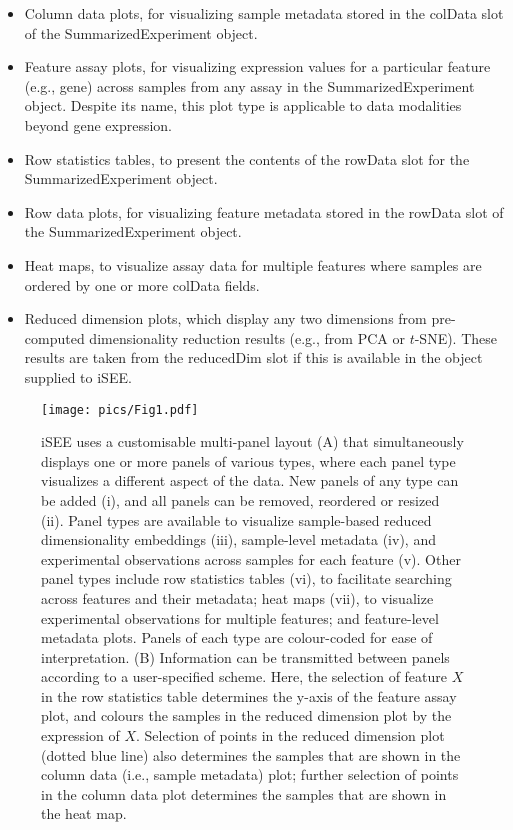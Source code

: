 \documentclass[10pt,a4paper,twocolumn]{article}
\begin{document}
\begin{itemize}
\item Column data plots, for visualizing sample metadata stored in the colData slot of the SummarizedExperiment object.
\item Feature assay plots, for visualizing expression values for a particular feature (e.g., gene) across samples from any assay in the SummarizedExperiment object.
Despite its name, this plot type is applicable to data modalities beyond gene expression.
\item Row statistics tables, to present the contents of the rowData slot for the SummarizedExperiment object.
\item Row data plots, for visualizing feature metadata stored in the rowData slot of the SummarizedExperiment object.
\item Heat maps, to visualize assay data for multiple features where samples are ordered by one or more colData fields.
\item Reduced dimension plots, which display any two dimensions from pre-computed dimensionality reduction results (e.g., from PCA or $t$-SNE).
These results are taken from the reducedDim slot if this is available in the object supplied to iSEE.
\end{itemize}

\begin{figure*}[t]
\texttt{[image: pics/Fig1.pdf]}
\caption{iSEE uses a customisable multi-panel layout (A) that simultaneously displays one or more panels of various types, where each panel type visualizes a different aspect of the data.
New panels of any type can be added (i), and all panels can be removed, reordered or resized (ii).
Panel types are available to visualize sample-based reduced dimensionality embeddings (iii), sample-level metadata (iv), and experimental observations across samples for each feature (v).
Other panel types include row statistics tables (vi), to facilitate searching across features and their metadata; heat maps (vii), to visualize experimental observations for multiple features; and feature-level metadata plots.
Panels of each type are colour-coded for ease of interpretation.
(B) Information can be transmitted between panels according to a user-specified scheme.
Here, the selection of feature $X$ in the row statistics table determines the y-axis of the feature assay plot, and colours the samples in the reduced dimension plot by the expression of $X$.
Selection of points in the reduced dimension plot (dotted blue line) also determines the samples that are shown in the column data (i.e., sample metadata) plot;
further selection of points in the column data plot determines the samples that are shown in the heat map.
}
\label{fig:iSEE}
\end{figure*}
\end{document}
